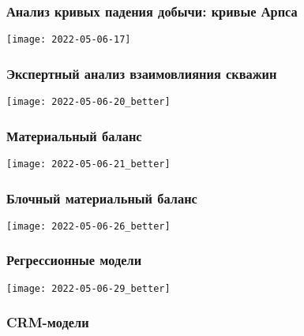 \documentclass[main.tex]{subfiles}
\begin{document}


\subsubsection{Анализ кривых падения добычи: кривые Арпса}

\texttt{[image: 2022-05-06-17]}



\subsubsection{Экспертный анализ взаимовлияния скважин}

\texttt{[image: 2022-05-06-20\_better]}

\subsubsection{Материальный баланс}

\texttt{[image: 2022-05-06-21\_better]}





\subsubsection{Блочный материальный баланс}

\texttt{[image: 2022-05-06-26\_better]}



\subsubsection{Регрессионные модели}

\texttt{[image: 2022-05-06-29\_better]}

\subsubsection{CRM-модели}
\end{document}
